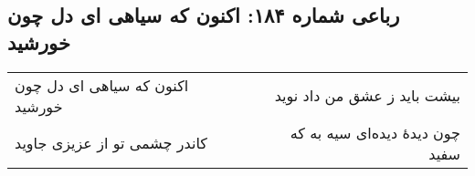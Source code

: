 \begin{center}
\section*{رباعی شماره ۱۸۴: اکنون که سیاهی ای دل چون خورشید}
\label{sec:sh184}
\begin{longtable}{l p{0.5cm} r}
اکنون که سیاهی ای دل چون خورشید
&&
بیشت باید ز عشق من داد نوید
\\
کاندر چشمی تو از عزیزی جاوید
&&
چون دیدهٔ دیده‌ای سیه به که سفید
\\
\end{longtable}
\end{center}
